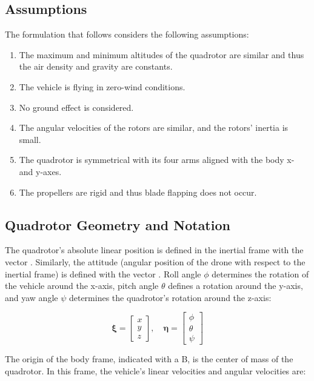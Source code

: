 \documentclass[letterpaper, 10 pt, conference]{ieeeconf}  %
\begin{document}
\subsection{Assumptions}

The formulation that follows considers the following assumptions:
\begin{enumerate}
	\item The maximum and minimum altitudes of the quadrotor are similar and thus the air density and gravity are constants.
	\item The vehicle is flying in zero-wind conditions.
	\item No ground effect is considered.
	\item \label{as:Ir} The angular velocities of the rotors are similar, and the rotors' inertia is small.
	\item \label{as:inertia} The quadrotor is symmetrical with its four arms aligned with the body x- and y-axes.
	\item The propellers are rigid and thus blade flapping does not occur.
\end{enumerate}

\subsection{Quadrotor Geometry and Notation}

The quadrotor's absolute linear position is defined in the inertial frame with the vector \bm{$\xi$}. Similarly, the attitude (angular position of the drone with respect to the inertial frame) is defined with the vector \bm{$\eta$}. Roll angle $\phi$ determines the rotation of the vehicle around the x-axis, pitch angle $\theta$ defines a rotation around the y-axis, and yaw angle $\psi$ determines the quadrotor's rotation around the z-axis:


$$\bm{\xi}=\left[ \begin{array}{l}{x} \\ {y} \\ {z}\end{array}\right],
\quad \bm{\eta}=\left[ \begin{array}{l}{\phi} \\ {\theta} \\ {\psi}\end{array}\right]$$

The origin of the body frame, indicated with a B, is the center of mass of the quadrotor. In this frame, the vehicle's linear velocities  and angular velocities \bm{$\nu$} are:
\end{document}
